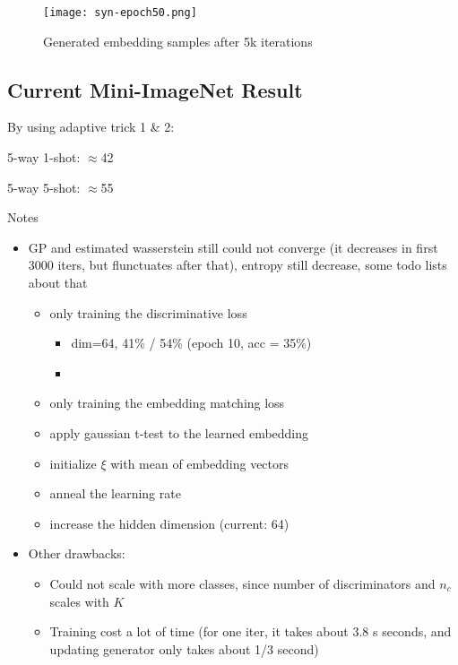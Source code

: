 \documentclass{article}
\begin{document}
\begin{figure}
\centering
\texttt{[image: syn-epoch50.png]}
\label{syn-epoch50}
\caption{Generated embedding samples after 5k iterations}
\end{figure}

\subsection{Current Mini-ImageNet Result}

By using adaptive trick 1 \& 2:

5-way 1-shot: $\approx$42

5-way 5-shot: $\approx$55

Notes

\begin{itemize}
    \item GP and estimated wasserstein still could not converge (it decreases in first ~ 3000 iters, but flunctuates after that), entropy still decrease, some todo lists about that
    \begin{itemize}
        \item only training the discriminative loss
        \begin{itemize}
            \item dim=64, 41\% / 54\% (epoch 10, acc = 35\%)
            \item 
        \end{itemize}
        \item only training the embedding matching loss
        \item apply gaussian t-test to the learned embedding
        \item initialize $\xi$ with mean of embedding vectors
        \item anneal the learning rate
        \item increase the hidden dimension (current: 64)
    \end{itemize}
    \item Other drawbacks:
    \begin{itemize}
        \item Could not scale with more classes, since number of discriminators and $n_c$ scales with $K$
        \item Training cost a lot of time (for one iter, it takes about 3.8 s seconds, and updating generator only takes about 1/3 second)
    \end{itemize}
\end{itemize}
\end{document}
